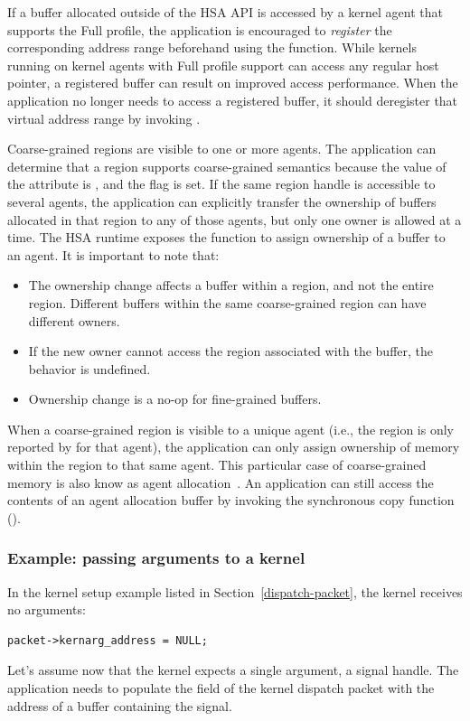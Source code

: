 \documentclass[final,oneside]{book}
\begin{document}
If a buffer allocated outside of the HSA API is accessed by a kernel agent
that supports the Full profile, the application is encouraged to \emph{register}
the corresponding address range beforehand using the
 function. While kernels running on kernel agents
with Full profile support can access any regular host pointer, a registered
buffer can result on improved access performance.  When the application no
longer needs to access a registered buffer, it should deregister that virtual
address range by invoking .

Coarse-grained regions are visible to one or more agents. The application can
determine that a region supports coarse-grained semantics because the value of
the attribute  is
, and the
 flag is set. If the same region
handle is accessible to several agents, the application can explicitly transfer
the ownership of buffers allocated in that region to any of those agents, but
only one owner is allowed at a time. The HSA runtime exposes the function
 to assign ownership of a buffer to an agent. It
is important to note that:
\begin{itemize}[itemsep=1pt,topsep=3pt,partopsep=0pt]
\item The ownership change affects a buffer within a region, and not the entire
  region. Different buffers within the same coarse-grained region can have
  different owners.
\item If the new owner cannot access the region associated with the buffer, the
  behavior is undefined.
\item Ownership change is a no-op for fine-grained buffers.
\end{itemize}

When a coarse-grained region is visible to a unique agent (i.e., the region
is only reported by  for that agent), the
application can only assign ownership of memory within the region to that same
agent. This particular case of coarse-grained memory is also know as agent
allocation~\cite{prm}. An application can still access the contents of an agent
allocation buffer by invoking the synchronous copy function
().

\subsubsection{Example: passing arguments to a kernel}\label{ex:kernarg_dispatch}
In the kernel setup example listed in Section~\ref{dispatch-packet}, the kernel
receives no arguments:
\begin{lstlisting}
packet->kernarg_address = NULL;
\end{lstlisting}
Let's assume now that the kernel expects a single argument, a signal handle. The
application needs to populate the
 field of the kernel
dispatch packet with the address of a buffer containing the signal.
\end{document}
